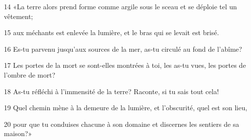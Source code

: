 
14 «La terre alors prend forme comme argile sous le sceau et se déploie tel un vêtement;

15 aux méchants est enlevée la lumière, et le bras qui se levait est brisé.

16 Es-tu parvenu jusqu’aux sources de la mer, as-tu circulé au fond de l’abîme?

17 Les portes de la mort se sont-elles montrées à toi, les as-tu vues, les portes de l’ombre de mort?

18 As-tu réfléchi à l’immensité de la terre? Raconte, si tu sais tout cela!

19 Quel chemin mène à la demeure de la lumière, et l’obscurité, quel est son lieu,

20 pour que tu conduises chacune à son domaine et discernes les sentiers de sa maison?»